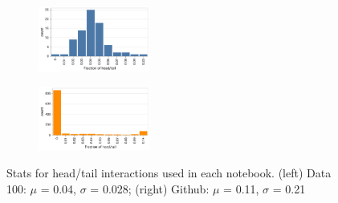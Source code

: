 \begin{figure}[h!]
     \centering
     \begin{subfigure}%
         \centering
         \includegraphics[width=0.4\textwidth]{submissions/interactivity/figures/ds_nht_v2.pdf}
     \end{subfigure}
     \hfill
     \begin{subfigure}%
         \centering
         \includegraphics[width=0.4\textwidth]{submissions/interactivity/figures/gb_nht_v2.pdf}
     \end{subfigure}
     \caption{Stats for head/tail interactions used in each notebook. (left) Data 100: $\mu$ = 0.04, $\sigma$ = 0.028; (right) Github: $\mu$ = 0.11, $\sigma$ = 0.21}
     \label{fig:stats}
\end{figure}


